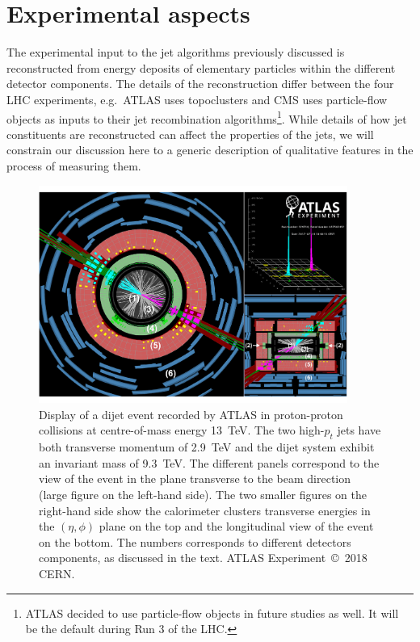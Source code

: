 %
\section{Experimental aspects}\label{chap:experimental}

The experimental input to the jet algorithms previously discussed is
reconstructed from energy deposits of elementary particles within the
different detector components. The details of the reconstruction
differ between the four LHC experiments, e.g.\ ATLAS uses topoclusters
and CMS uses particle-flow objects as inputs to their jet
recombination algorithms\footnote{ATLAS decided to use particle-flow objects in future studies as well. It will be the default during Run 3 of the LHC.}.
%
While details of how jet constituents are reconstructed can affect the
properties of the jets, we will
constrain our discussion here to a generic description of qualitative
features in the process of measuring them.


\begin{figure}
  \centerline{\includegraphics[width=0.90\textwidth]{figures/dijet_event_ATLAS.pdf}}
  \caption{
 Display of a dijet event recorded by ATLAS in proton-proton collisions at centre-of-mass energy 13~TeV. 
The two high-$p_t$ jets have both transverse momentum of 2.9~TeV and the dijet system exhibit an invariant mass of 9.3~TeV. 
The different panels correspond to the view of the event in the plane transverse to the beam direction (large figure on the left-hand side). The two smaller figures on the right-hand side show the calorimeter clusters transverse energies in the $(\eta,\phi)$ plane on the top and the longitudinal view of the event on the bottom. 
The numbers corresponds to different detectors components, as discussed in the text. 
ATLAS Experiment~\copyright~2018 CERN.}
  \label{fig:detector}
\end{figure}

